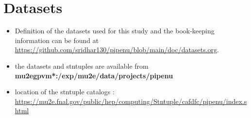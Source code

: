 \appendix

\section {Datasets}
\label{appendix_b}

\begin{itemize}
\item 
  Definition of the datasets used for this study and the book-keeping information
  can be found at \\
  \href{https://github.com/sridhar130/pipenu/blob/main/doc/datasets.org}
  {\blue https://github.com/sridhar130/pipenu/blob/main/doc/datasets.org}.
\item
  the datasets and stntuples are available from {\bf mu2egpvm*:/exp/mu2e/data/projects/pipenu}
\item
  location of the stntuple catalogs : \\
  \href{https://mu2e.fnal.gov/public/hep/computing/Stntuple/cafdfc/pipenu/index.shtml}
  {\blue https://mu2e.fnal.gov/public/hep/computing/Stntuple/cafdfc/pipenu/index.shtml}
\end{itemize}

